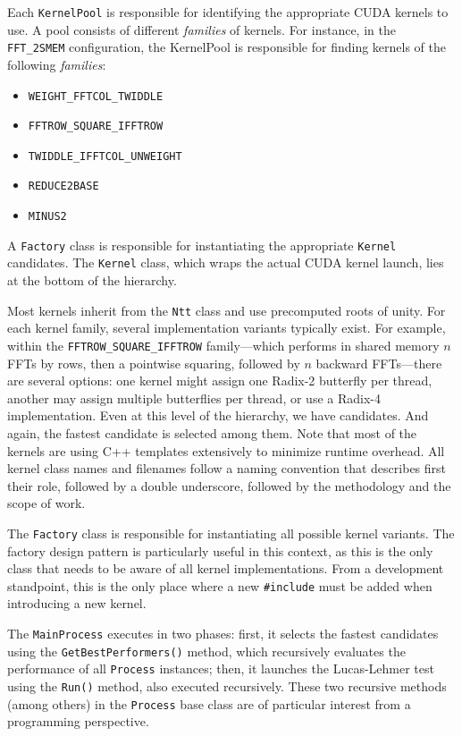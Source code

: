 \documentclass{article}
\begin{document}
Each \texttt{KernelPool} is responsible for identifying the appropriate CUDA kernels to use. A pool consists of different \emph{families} of kernels. For instance, in the \texttt{FFT\_2SMEM} configuration, the KernelPool is responsible for finding kernels of the following \emph{families}:
\begin{itemize}
    \item \texttt{WEIGHT\_FFTCOL\_TWIDDLE}
    \item \texttt{FFTROW\_SQUARE\_IFFTROW}
    \item \texttt{TWIDDLE\_IFFTCOL\_UNWEIGHT}
    \item \texttt{REDUCE2BASE}
    \item \texttt{MINUS2}
\end{itemize}
A \texttt{Factory} class is responsible for instantiating the appropriate \texttt{Kernel} candidates. The \texttt{Kernel} class, which wraps the actual CUDA kernel launch, lies at the bottom of the hierarchy. 

Most kernels inherit from the \texttt{Ntt} class and use precomputed roots of unity. For each kernel family, several implementation variants typically exist. For example, within the \texttt{FFTROW\_SQUARE\_IFFTROW} family—which performs in shared memory $n$ FFTs by rows, then a pointwise squaring, followed by $n$ backward FFTs—there are several options: one kernel might assign one Radix-2 butterfly per thread, another may assign multiple butterflies per thread, or use a Radix-4 implementation. Even at this level of the hierarchy, we have candidates. And again, the fastest candidate is selected among them. Note that most of the kernels are using C++ templates extensively to minimize runtime overhead. All kernel class names and filenames follow a naming convention that describes first their role, followed by a double underscore, followed by the methodology and the scope of work.

The \texttt{Factory} class is responsible for instantiating all possible kernel variants. The factory design pattern is particularly useful in this context, as this is the only class that needs to be aware of all kernel implementations. From a development standpoint, this is the only place where a new \texttt{\#include} must be added when introducing a new kernel.

The \texttt{MainProcess} executes in two phases: first, it selects the fastest candidates using the \texttt{GetBestPerformers()} method, which recursively evaluates the performance of all \texttt{Process} instances; then, it launches the Lucas-Lehmer test using the \texttt{Run()} method, also executed recursively. These two recursive methods (among others) in the \texttt{Process} base class are of particular interest from a programming perspective.
\end{document}
